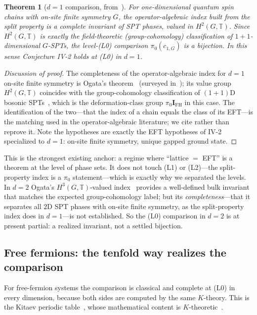 \documentclass[12pt]{article}
\newcommand{\IFH}{\mathbf{I}_{\mathrm{FH}}}  %
\newcommand{\Tt}{\mathbb{T}}
\newtheorem{theorem}{Theorem}[section]
\theoremstyle{definition}
\theoremstyle{remark}
\theoremstyle{plain}
\begin{document}
\begin{theorem}[$d=1$ comparison, from~\cite{ogata-spt-chains,ogata-classification-review}]
\label{thm:d1}
For one-dimensional quantum spin chains with on-site finite symmetry $G$, the
operator-algebraic index built from the split property is a \emph{complete}
invariant of SPT phases, valued in $H^2(G,\Tt)$. Since $H^2(G,\Tt)$ is exactly
the field-theoretic (group-cohomology) classification of $1{+}1$-dimensional
$G$-SPTs, the level-(L0) comparison $\pi_0(c_{1,G})$ is a bijection. In this
sense Conjecture IV-2 holds at (L0) in $d=1$.
\end{theorem}

\begin{proof}[Discussion of proof]
The completeness of the operator-algebraic index for $d=1$ on-site finite
symmetry is Ogata's theorem~\cite{ogata-spt-chains} (surveyed
in~\cite{ogata-classification-review}); its value group
$H^2(G,\Tt)$ coincides with the group-cohomology classification of
$(1{+}1)$D bosonic SPTs~\cite{cglw-cohomology}, which is the deformation-class
group $\pi_0\IFH$ in this case. The identification of the two---that the index of
a chain equals the class of its EFT---is the matching used in the
operator-algebraic literature; we cite rather than reprove it. Note the
hypotheses are exactly the EFT hypotheses of IV-2 specialized to $d=1$: on-site
finite symmetry, unique gapped ground state.
\end{proof}

This is the strongest existing anchor: a regime where ``lattice $=$ EFT'' is a
theorem at the level of phase sets. It does not touch (L1) or (L2)---the split-property
index is a $\pi_0$ statement---which is exactly why we separated the levels. In
$d=2$ Ogata's $H^3(G,\Tt)$-valued index~\cite{ogata-h3-index,ogata-spt-chains}
provides a well-defined bulk invariant that matches the expected group-cohomology
label; but its \emph{completeness}---that it separates all $2$D SPT phases with
on-site finite symmetry, as the split-property index does in $d=1$---is not
established. So the (L0) comparison in $d=2$ is at present partial: a realized
invariant, not a settled bijection.

\subsection{Free fermions: the tenfold way realizes the comparison}

For free-fermion systems the comparison is classical and complete at (L0) in
every dimension, because both sides are computed by the same $K$-theory. This is
the Kitaev periodic table~\cite{kitaev-periodic-table}, whose mathematical
content is $K$-theoretic~\cite{thiang-ktheory,prodan-sb}.
\end{document}
